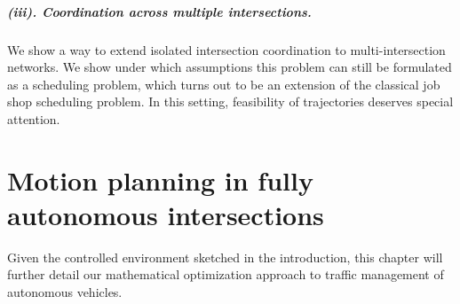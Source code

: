 \documentclass[a4paper]{report}
\theoremstyle{definition}
\theoremstyle{plain}
\begin{document}
\paragraph{(iii). Coordination across multiple intersections.}
We show a way to extend isolated intersection coordination to multi-intersection
networks. We show under which assumptions this problem can still be formulated
as a scheduling problem, which turns out to be an extension of the classical job
shop scheduling problem.
%
In this setting, feasibility of trajectories deserves special attention.




\chapter{Motion planning in fully autonomous intersections}\label{chap:single}

Given the controlled environment sketched in the introduction, this chapter will
further detail our mathematical optimization approach to traffic management of
autonomous vehicles.
\end{document}
